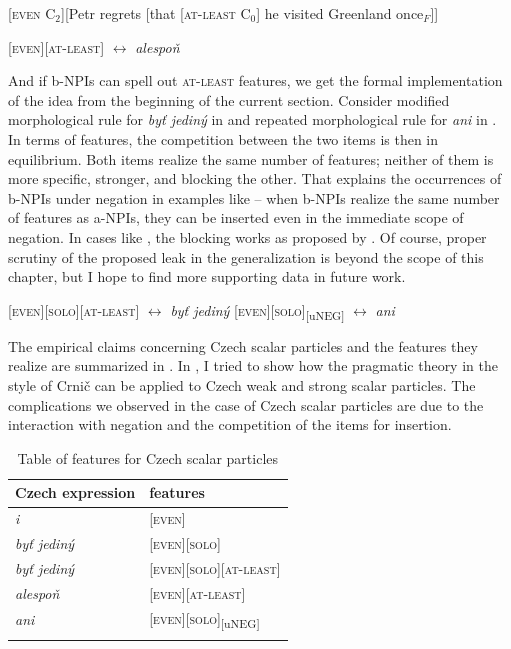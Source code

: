 \documentclass[output=paper,colorlinks,citecolor=brown]{langscibook}
\begin{document}
\ea\label{ex:63}[\textsc{even} C$_2$][Petr regrets [that [\textsc{at-least} C$_0$] he visited Greenland once$_F$]]
\z

\ea\label{ex:64} [\textsc{even}][\textsc{at-least}] $\leftrightarrow$ \textit{alespoň} 
\z

\noindent And if b-NPIs can spell out \textsc{at-least} features, we get the formal implementation of the idea from the beginning of the current section. Consider modified morphological rule for \emph{byť jediný} in  and repeated morphological rule for \emph{ani} in . In terms of features, the competition between the two items is then in equilibrium. Both items realize the same number of features; neither of them is more specific, stronger, and blocking the other. That explains the occurrences of b-NPIs under negation in examples like  -- when b-NPIs realize the same number of features as a-NPIs, they can be inserted even in the immediate scope of negation. In cases like , the blocking works as proposed by \citet[chap. 5]{Crnic2011}. Of course, proper scrutiny of the proposed leak in the generalization  is beyond the scope of this chapter, but I hope to find more supporting data in future work.

\ea\label{ex:69} \ea\label{ex:69-a} [\textsc{even}][\textsc{solo}][\textsc{at-least}] $\leftrightarrow$ \textit{byť jediný}
\ex\label{ex:69-b} [\textsc{even}][\textsc{solo}]\textsubscript{[uNEG]} $\leftrightarrow$ \textit{ani}
\z
\z


\noindent The empirical claims concerning Czech scalar particles and the features they realize are summarized in . In , I tried to show how the pragmatic theory in the style of Crnič can be applied to Czech weak and strong scalar particles. The complications we observed in the case of Czech scalar particles are due to the interaction with negation and the competition of the items for insertion. 

\begin{table}
\begin{tabular}{ll}
\lsptoprule
Czech expression & features                            \\ \midrule
\textit{i}          & {[}\textsc{even}{]}\smallskip                          \\
\textit{byť jediný} & {[}\textsc{even}{]}{[}\textsc{solo}{]}\smallskip                \\
\textit{byť jediný} & {[}\textsc{even}{]}{[}\textsc{solo}{]}{[}\textsc{at-least}{]}\smallskip  \\
\textit{alespoň}    & {[}\textsc{even}{]}{[}\textsc{at-least}{]}    \smallskip        \\
\textit{ani}        & {[}\textsc{even}{]}{[}\textsc{solo}{]}\textsubscript{[uNEG]} \\
\lspbottomrule
\end{tabular}
\caption{Table of features for Czech scalar particles}
\label{tab:CzechFeatureTable}
\end{table}
\end{document}

